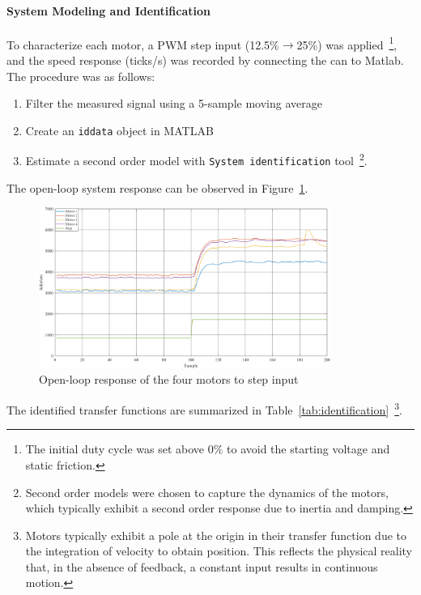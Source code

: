 \paragraph*{System Modeling and Identification}
To characterize each motor, a PWM step input (12.5\%$\rightarrow$25\%) was applied~\footnote{The initial duty cycle was set above $0\%$ to avoid the starting voltage and static friction.}, and the speed response (ticks/s) was recorded by connecting the \gls{can} to Matlab. The procedure was as follows:
\begin{enumerate}
  \item Filter the measured signal using a 5-sample moving average
  \item Create an \texttt{iddata} object in MATLAB
  \item Estimate a second order model with \texttt{System identification} tool~\footnote{Second order models were chosen to capture the dynamics of the motors, which typically exhibit a second order response due to inertia and damping.}.
\end{enumerate}

The open-loop system response can be observed in Figure~\ref{fig:openloopres}.

\begin{figure}[H]
  \centering
  \includegraphics[width=0.85\textwidth]{imgs/openloopres.png}
  \caption{Open-loop response of the four motors to step input}
  \label{fig:openloopres}
\end{figure}

The identified transfer functions are summarized in Table~\ref{tab:identification}~\footnote{Motors typically exhibit a pole at the origin in their transfer function due to the integration of velocity to obtain position. This reflects the physical reality that, in the absence of feedback, a constant input results in continuous motion.}.


